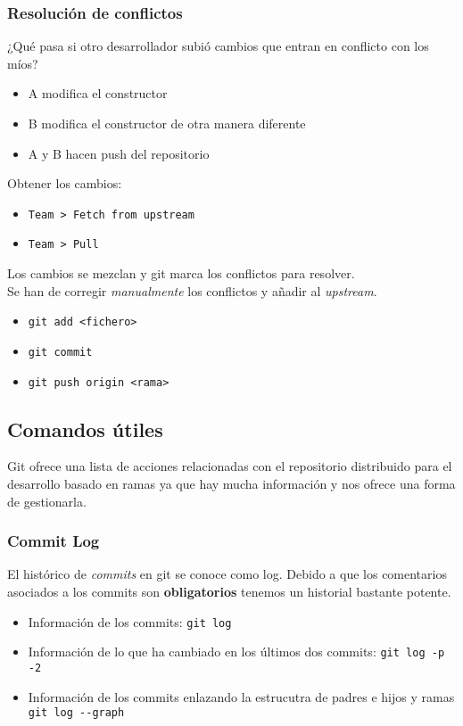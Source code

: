 \subsubsection{Resolución de conflictos}

¿Qué pasa si otro desarrollador subió cambios que entran en conflicto
con los míos?

\begin{itemize}
\item
  A modifica el constructor
\item
  B modifica el constructor de otra manera diferente
\item
  A y B hacen push del repositorio
\end{itemize}
Obtener los cambios:

\begin{itemize}
\item
  \texttt{Team \textgreater{} Fetch from upstream}
\item
  \texttt{Team \textgreater{} Pull}
\end{itemize}
Los cambios se mezclan y git marca los conflictos para resolver.\\Se han
de corregir \emph{manualmente} los conflictos y añadir al
\emph{upstream}.

\begin{itemize}
\item
  \texttt{git add \textless{}fichero\textgreater{}}
\item
  \texttt{git commit}
\item
  \texttt{git push origin \textless{}rama\textgreater{}}
\end{itemize}
\subsection{Comandos útiles}

Git ofrece una lista de acciones relacionadas con el repositorio
distribuido para el desarrollo basado en ramas ya que hay mucha
información y nos ofrece una forma de gestionarla.

\subsubsection{Commit Log}

El histórico de \emph{commits} en git se conoce como log. Debido a que
los comentarios asociados a los commits son \textbf{obligatorios}
tenemos un historial bastante potente.

\begin{itemize}
\item
  Información de los commits: \texttt{git log}
\item
  Información de lo que ha cambiado en los últimos dos commits:
  \texttt{git log -p -2}
\item
  Información de los commits enlazando la estrucutra de padres e hijos y
  ramas \texttt{git log -{}-graph}
\end{itemize}
